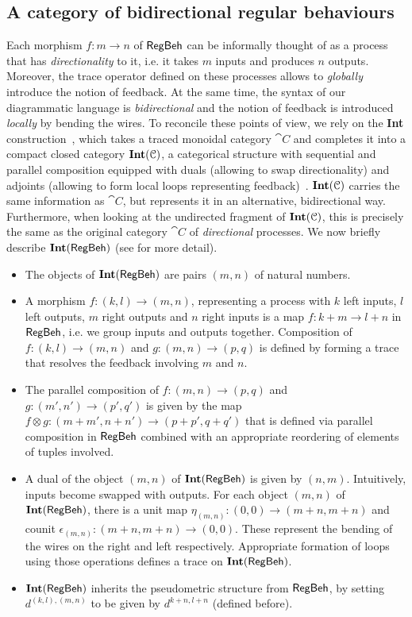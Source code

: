 \subsection{A category of bidirectional regular behaviours}
 Each morphism $f \colon m \to n$ of $\mathsf{RegBeh}$ can be informally thought of as a process that has \emph{directionality} to it, i.e. it takes $m$ inputs and produces $n$ outputs. Moreover, the trace operator defined on these processes allows to \emph{globally} introduce the notion of feedback. At the same time, the syntax of our diagrammatic language is \emph{bidirectional} and the notion of feedback is introduced \emph{locally} by bending the wires. To reconcile these points of view, we rely on the \textbf{Int} construction~\cite{Joyal:1996:Traced}, which takes a traced monoidal category $\cat{C}$ and completes it into a compact closed category $\mathbf{Int}(\mathcal{C})$, a categorical structure with sequential and parallel composition equipped with duals (allowing to swap directionality) and adjoints (allowing to form local loops representing feedback)~\cite{kellylaplaza}. $\mathbf{Int}(\mathcal{C})$ carries the same information as $\cat{C}$, but represents it in an alternative, bidirectional way. Furthermore, when looking at the undirected fragment of $\mathbf{Int}(\mathcal{C})$, this is precisely the same as the original category $\cat{C}$ of \emph{directional} processes. We now briefly describe $\mathbf{Int}(\mathsf{RegBeh})$ (see  for more detail). 
	\begin{itemize}
		\item The objects of $\mathbf{Int}(\mathsf{RegBeh})$ are pairs $(m,n)$ of natural numbers. 
		\item A morphism $f \colon (k,l) \to (m,n)$, representing a process with $k$ left inputs, $l$ left outputs, $m$ right outputs and $n$ right inputs is a map $f \colon k + m \to l + n$ in $\mathsf{RegBeh}$, i.e. we group inputs and outputs together. Composition of $f \colon (k,l) \to (m,n)$ and $g \colon (m,n) \to (p,q)$ is defined by forming a trace that resolves the feedback involving $m$ and $n$.
		\item The parallel composition of $f \colon (m,n) \to (p,q)$ and $g \colon (m',n') \to (p',q')$ is given by the map $f \otimes g \colon (m + m', n + n') \to (p + p', q + q')$ that is defined via parallel composition in $\mathsf{RegBeh}$ combined with an appropriate reordering of elements of tuples involved.
		\item A dual of the object $(m,n)$ of $\mathbf{Int}(\mathsf{RegBeh})$ is given by $(n,m)$. Intuitively, inputs become swapped with outputs. For each object $(m,n)$ of $\mathbf{Int}(\mathsf{RegBeh})$, there is a unit map $\eta_{(m,n)} \colon (0,0) \to (m+n, m+n)$ and counit $\epsilon_{(m,n)} \colon (m+n, m+n) \to (0,0)$. These represent the bending of the wires on the right and left respectively. Appropriate formation of loops using those operations defines a trace on $\mathbf{Int}(\mathsf{RegBeh})$.
		\item $\mathbf{Int}(\mathsf{RegBeh})$ inherits the pseudometric structure from $\mathsf{RegBeh}$, by setting $d^{(k,l),(m,n)}$ to be given by $d^{k + n, l +n}$ (defined before).
	\end{itemize}

